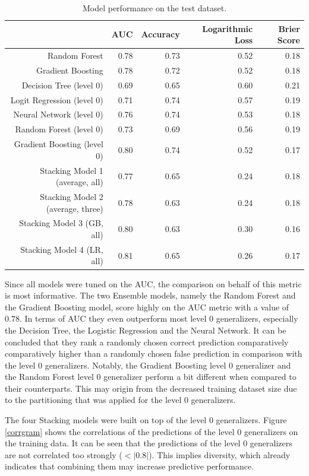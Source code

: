 \documentclass[12pt]{article}
\begin{document}
\begin{table}[ht]
\centering
\begin{tabular}{rrrrr}
  \hline
 & AUC & Accuracy & Logarithmic Loss & Brier Score \\ 
  \hline
Random Forest & 0.78 & 0.73 & 0.52 & 0.18 \\ 
  Gradient Boosting & 0.78 & 0.72 & 0.52 & 0.18 \\
\hline 
  Decision Tree (level 0) & 0.69 & 0.65 & 0.60 & 0.21 \\ 
  Logit Regression (level 0) & 0.71 & 0.74 & 0.57 & 0.19 \\ 
  Neural Network (level 0) & 0.76 & 0.74 & 0.53 & 0.18 \\ 
  Random Forest (level 0) & 0.73 & 0.69 & 0.56 & 0.19 \\ 
  Gradient Boosting (level 0) & 0.80 & 0.74 & 0.52 & 0.17 \\ 
\hline
  Stacking Model 1 (average, all) & 0.77 & 0.65 & 0.24 & 0.18 \\ 
  Stacking Model 2 (average, three) & 0.78 & 0.63 & 0.24 & 0.18 \\ 
  Stacking Model 3 (GB, all) & 0.80 & 0.63 & 0.30 & 0.16 \\ 
  Stacking Model 4 (LR, all) & 0.81 & 0.65 & 0.26 & 0.17 \\ 
   \hline
\end{tabular}
\caption{Model performance on the test dataset.}\label{eval}
\end{table}

Since all models were tuned on the AUC, the comparison on behalf of this metric is most informative. The two Ensemble models, namely the Random Forest and the Gradient Boosting model, score highly on the AUC metric with a value of $0.78$. In terms of AUC they even outperform most level 0 generalizers, especially the Decision Tree, the Logistic Regression and the Neural Network. It can be concluded that they rank a randomly chosen correct prediction comparatively comparatively higher than a randomly chosen false prediction in comparison with the level 0 generalizers. Notably, the Gradient Boosting level 0 generalizer and the Random Forest level 0 generalizer perform a bit different when compared to their counterparts. This may origin from the decreased training dataset size due to the partitioning that was applied for the level 0 generalizers. 

The four Stacking models were built on top of the level 0 generalizers. Figure \ref{corrgram} shows the correlations of the predictions of the level 0 generalizers on the training data. It can be seen that the predictions of the level 0 generalizers are not correlated too strongly ($<|0.8|$). This implies diversity, which already indicates that combining them may increase predictive performance.
\end{document}
